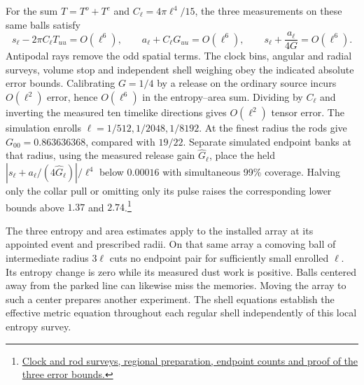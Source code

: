 \documentclass[11pt]{article}
\begin{document}
For the sum $T=T^o+T^c$ and $C_\ell=4\pi\ell^4/15$, the three
measurements on these same balls satisfy
\[
 s_\ell-2\pi C_\ell T_{uu}=O(\ell^6),\qquad
 a_\ell+C_\ell G_{uu}=O(\ell^6),\qquad
 s_\ell+\frac{a_\ell}{4G}=O(\ell^6).
\]
Antipodal rays remove the odd spatial terms. The clock bins, angular
and radial surveys, volume stop and independent shell weighing obey
the indicated absolute error bounds. Calibrating $G=1/4$ by a release
on the ordinary source incurs $O(\ell^2)$ error, hence $O(\ell^6)$ in
the entropy--area sum. Dividing by $C_\ell$ and inverting the measured
ten timelike directions gives $O(\ell^2)$ tensor error. The simulation
enrolls $\ell=1/512,1/2048,1/8192$. At the finest radius the rods give
$G_{00}=0.863636368$, compared with $19/22$. Separate simulated endpoint
banks at that radius, using the measured release gain $\widehat G_\ell$,
place the held $|s_\ell+a_\ell/(4\widehat G_\ell)|/\ell^4$ below
$0.00016$ with simultaneous 99\% coverage. Halving only the collar
pull or omitting only its pulse raises the corresponding lower bounds
above $1.37$ and $2.74$.\footnote{\href{https://github.com/FloatingPragma/observer-patch-holography/tree/main/model/candidate_laws/interval_echo_published_records/spherical_dust}{Clock and rod surveys, regional preparation, endpoint counts and proof of the three error bounds.}}

The three entropy and area estimates apply to the installed array at its
appointed event and prescribed radii. On that same array a comoving ball of
intermediate radius $3\ell$ cuts no endpoint pair for sufficiently small
enrolled $\ell$. Its entropy change is zero while its measured dust work
is positive. Balls centered away from the parked line can likewise miss
the memories. Moving the array to such a center prepares another
experiment. The shell equations establish the effective metric equation
throughout each regular shell independently of this local entropy survey.
\end{document}
